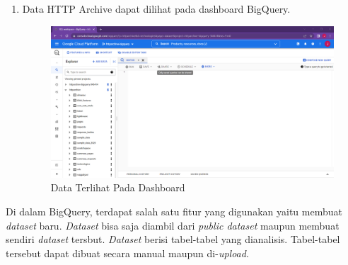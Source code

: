 \begin{enumerate}
	
	\item Data HTTP Archive dapat dilihat pada dashboard BigQuery.
	\begin{figure}[H]
		\centering  
		\includegraphics[scale=0.35]{Gambar/BG-Dashboard.PNG}  
		\caption{Data Terlihat Pada Dashboard} 
		\label{fig:BQ-Dashboard} 
	\end{figure}
\end{enumerate}

Di dalam BigQuery, terdapat salah satu fitur yang digunakan yaitu membuat \textit{dataset} baru. \textit{Dataset} bisa saja diambil dari \textit{public dataset} maupun membuat sendiri \textit{dataset} tersbut. \textit{Dataset} berisi tabel-tabel yang dianalisis. Tabel-tabel tersebut dapat dibuat secara manual maupun di-\textit{upload}.

